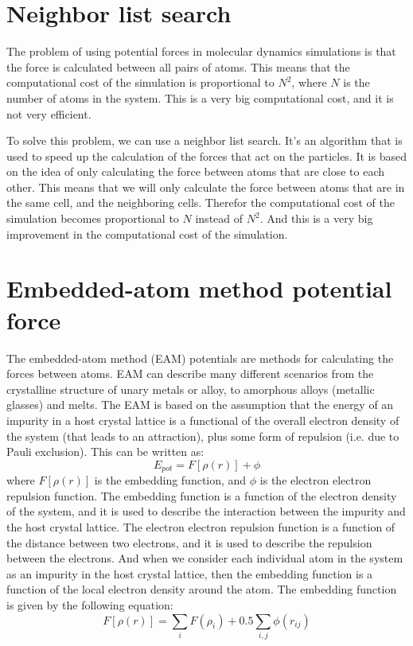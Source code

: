 \section{Neighbor list search}
    The problem of using potential forces in molecular dynamics simulations is that the force is calculated between all pairs of atoms. This means that the computational cost of the simulation is proportional to $N^2$, where $N$ is the number of atoms in the system. This is a very big computational cost, and it is not very efficient.  

    To solve this problem, we can use a neighbor list search\cite{arya1998optimal}. It's an algorithm that is used to speed up the calculation of the forces that act on the particles. 
    It is based on the idea of only calculating the force between atoms that are close to each other. This means that we will only calculate the force between atoms that are in the same cell, and the neighboring cells. Therefor the computational cost of the simulation becomes proportional to $N$ instead of $N^2$. And this is a very big improvement in the computational cost of the simulation. 
    
    

\section{Embedded-atom method potential force}
    The embedded-atom method (EAM) potentials are  methods for calculating the forces between atoms. EAM can describe many different scenarios from the crystalline structure of unary metals or alloy, to amorphous alloys (metallic glasses) and melts. The EAM is based on the assumption that the energy of an impurity in a host crystal lattice is a functional of the overall electron density of the system (that leads to an attraction), plus some form of repulsion (i.e. due to Pauli exclusion). This can be written as:
    \begin{equation}
        E_{pot} = F[\rho(r)] + \phi
    \end{equation}
    where $F[\rho(r)]$ is the embedding function, and $\phi$ is the electron electron repulsion function. The embedding function is a function of the electron density of the system, and it is used to describe the interaction between the impurity and the host crystal lattice.
    The electron electron repulsion function is a function of the distance between two electrons, and it is used to describe the repulsion between the electrons. And when we consider each individual atom in the system as an impurity in the host crystal lattice, then the embedding function is a function of the local electron density around the atom. The embedding function is given by the following equation:
    \begin{equation}
        F[\rho(r)] = \sum_{i} F(\rho_i) + 0.5\sum_{i,j} \phi(r_{ij})
    \end{equation}

